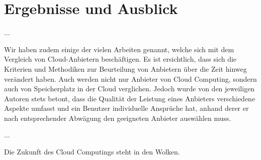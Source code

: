\section{Ergebnisse und Ausblick}
\label{sec_conclusion}

...



Wir haben zudem einige der vielen Arbeiten genannt, welche sich mit dem Vergleich von Cloud-Anbietern beschäftigen. 
Es ist ersichtlich, dass sich die Kriterien und Methodiken zur Beurteilung von Anbietern über die Zeit hinweg verändert haben. 
Auch werden nicht nur Anbieter von Cloud Computing, sondern auch von Speicherplatz in der Cloud verglichen. 
Jedoch wurde von den jeweiligen Autoren stets betont, dass die Qualität der Leistung eines Anbieters verschiedene Aspekte umfasst und ein Benutzer individuelle Ansprüche hat, anhand derer er nach entsprechender Abwägung den geeigneten Anbieter auswählen muss. 


...

Die Zukunft des Cloud Computings steht in den Wolken.